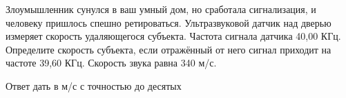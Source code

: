
Злоумышленник сунулся в ваш умный дом, но сработала сигнализация, и человеку пришлось спешно ретироваться. Ультразвуковой датчик над дверью измеряет скорость удаляющегося субъекта. Частота сигнала датчика 40,00 КГц. Определите скорость субъекта, если отражённый от него сигнал приходит на частоте 39,60 КГц. Скорость звука равна 340 м/с.

Ответ дать в м/с с точностью до десятых

